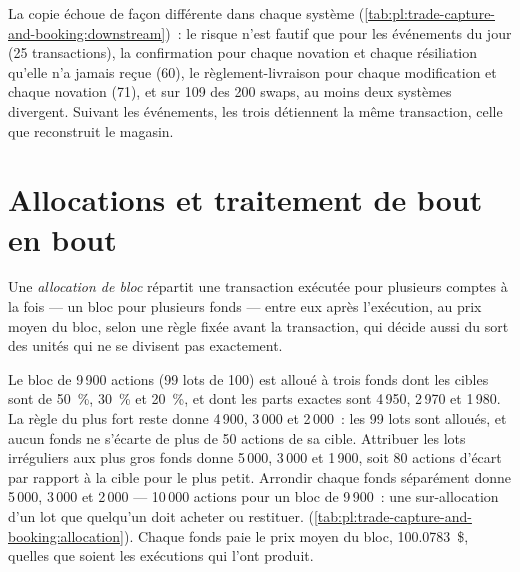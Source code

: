 La copie échoue de façon différente dans chaque système (\cref{tab:pl:trade-capture-and-booking:downstream})~: le risque n'est fautif que pour les événements du jour
(25 transactions), la confirmation pour chaque novation et chaque résiliation qu'elle n'a jamais reçue (60), le règlement-livraison pour chaque modification et chaque novation (71), et
sur 109 des 200 swaps, au moins deux systèmes divergent. Suivant les événements, les trois détiennent la même transaction, celle que reconstruit le magasin.

\section{Allocations et traitement de bout en bout}

\begin{definition}\label{def:pl:trade-capture-and-booking:allocation}
Une \emph{allocation de bloc} répartit une transaction exécutée pour plusieurs comptes à la fois --- un bloc pour plusieurs fonds --- entre
eux après l'exécution, au prix moyen du bloc, selon une règle fixée avant la transaction, qui décide aussi du sort des unités qui ne se divisent
pas exactement.
\end{definition}

\label{lst:pl:trade-capture-and-booking:allocate}

Le bloc de 9\,900 actions (99 lots de 100) est alloué à trois fonds dont les cibles sont de 50~\%, 30~\% et 20~\%, et dont les parts exactes sont 4\,950, 2\,970
et 1\,980. La règle du plus fort reste donne 4\,900, 3\,000 et 2\,000~: les 99 lots sont alloués, et aucun fonds ne s'écarte de plus de 50 actions de sa cible. Attribuer
les lots irréguliers aux plus gros fonds donne 5\,000, 3\,000 et 1\,900, soit 80 actions d'écart par rapport à la cible pour le plus petit. Arrondir chaque fonds séparément donne
5\,000, 3\,000 et 2\,000 --- 10\,000 actions pour un bloc de 9\,900~: une sur-allocation d'un lot que quelqu'un doit acheter ou restituer.
(\cref{tab:pl:trade-capture-and-booking:allocation}). Chaque fonds paie le prix moyen du bloc, 100.0783~\$, quelles que soient les exécutions qui l'ont produit.

